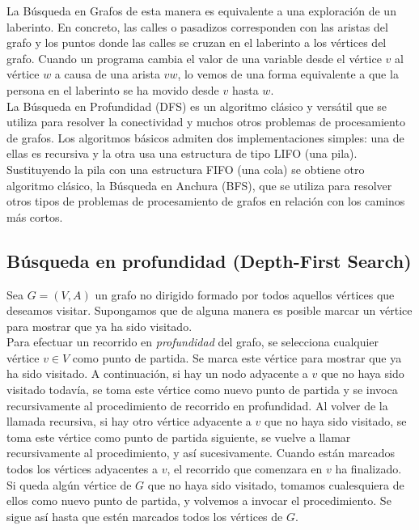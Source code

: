 La Búsqueda en Grafos de esta manera es equivalente a una exploración de un laberinto. En concreto, las calles o pasadizos corresponden con las aristas del grafo y los puntos donde las calles se cruzan en el laberinto a los vértices del grafo. Cuando un programa cambia el valor de una variable desde el vértice $v$ al vértice $w$ a causa de una arista $vw$, lo vemos de una forma equivalente a que la persona en el laberinto se ha movido desde $v$ hasta $w$.\\

La Búsqueda en Profundidad (DFS) es un algoritmo clásico y versátil que se utiliza para resolver la conectividad y muchos otros problemas de procesamiento de grafos. Los algoritmos básicos admiten dos implementaciones simples: una de ellas es recursiva y la otra usa una estructura de tipo LIFO (una pila). Sustituyendo la pila con una estructura FIFO (una cola) se obtiene otro algoritmo clásico, la Búsqueda en Anchura (BFS), que se utiliza para resolver otros tipos de problemas de procesamiento de grafos en relación con los caminos más cortos.\\

\subsection{Búsqueda en profundidad (Depth-First Search)}
\label{sec:profundidad}

Sea $G = (V,A)$ un grafo no dirigido formado por todos aquellos vértices que deseamos visitar. Supongamos que de alguna manera es posible marcar un vértice para mostrar que ya ha sido visitado. \\

Para efectuar un recorrido en \emph{profundidad} del grafo, se selecciona cualquier vértice $v \in V$ como punto de partida. Se marca este vértice para mostrar que ya ha sido visitado. A continuación, si hay un nodo adyacente a $v$ que no haya sido visitado todavía, se toma este vértice como nuevo punto de partida y se invoca recursivamente al procedimiento de recorrido en profundidad. Al volver de la llamada recursiva, si hay otro vértice adyacente a $v$ que no haya sido visitado, se toma este vértice como punto de partida siguiente, se vuelve a llamar recursivamente al procedimiento, y así sucesivamente. Cuando están marcados todos los vértices adyacentes a $v$, el recorrido que comenzara en $v$ ha finalizado. Si queda algún vértice de $G$ que no haya sido visitado, tomamos cualesquiera de ellos como nuevo punto de partida, y volvemos a invocar el procedimiento. Se sigue así hasta que estén marcados todos los vértices de $G$.\\

